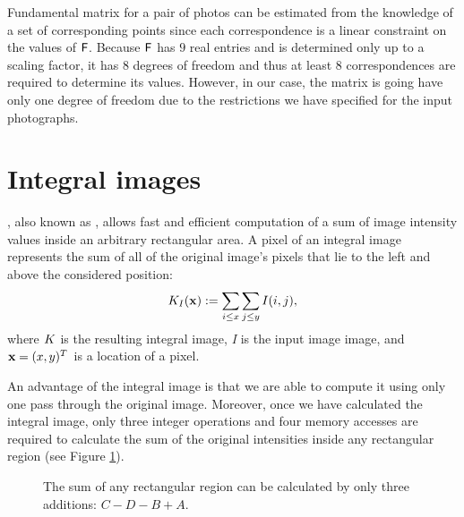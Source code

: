 Fundamental matrix for a pair of photos can be estimated from the knowledge of a set of corresponding points since each correspondence is a linear constraint on the values of $\mathsf{F}$. 
Because $\mathsf{F}$ has $9$ real entries and is determined only up to a scaling factor, it has $8$ degrees of freedom and thus at least $8$ correspondences are required to determine its values. 
However, in our case, the matrix is going have only one degree of freedom due to the restrictions we have specified for the input photographs. 

\section{Integral images}

, also known as , allows fast and efficient computation of a sum of image intensity values inside an arbitrary rectangular area.
A pixel of an integral image represents the sum of all of the original image's pixels that lie to the left and above the considered position: 
\begin{equation*}
K_I(\mathbf{x}) := \sum_{i \le x} \sum_{j \le y} I(i,j),
\end{equation*}
where $K$ is the resulting integral image, \emph{I} is the input image image, and $\mathbf{x} = (x, y)^{T}$ is a location of a pixel.

An advantage of the integral image is that we are able to compute it using only one pass through the original image. 
Moreover, once we have calculated the integral image, only three integer operations and four memory accesses are required to calculate the sum 
of the original intensities inside any rectangular region (see Figure \ref{fig:integral}).

\begin{figure}[h]
  \label{fig:integral}
  \caption{The sum of any rectangular region can be calculated by only three additions: $C - D - B + A$.}
\end{figure}

